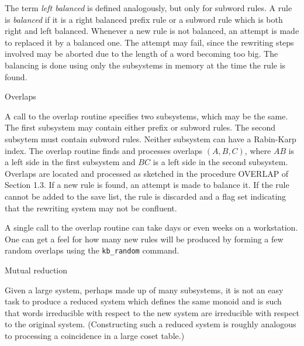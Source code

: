 The term {\it left balanced} is defined analogously, but only for
subword rules. A rule is {\it balanced} if it is a right balanced
prefix rule or a subword rule which is both right and left balanced.
Whenever a new rule is not balanced, an attempt is made to replaced it
by a balanced one.  The attempt may fail, since the rewriting steps
involved may be aborted due to the length of a word becoming too big.
The balancing is done using only the subsystems in memory at the time
the rule is found.

\bigskip
{} Overlaps

\nobreak

A call to the overlap routine specifies two subsystems, which may be
the same. The first subsystem may contain either prefix or subword
rules. The second subsytem must contain subword rules. Neither
subsystem can have a Rabin-Karp index.  The overlap routine finds and
processes overlaps $(A,B,C)$, where $AB$ is a left side in the first
subsystem and $BC$ is a left side in the second subsystem.  Overlaps
are located and processed as sketched in the procedure OVERLAP of
Section 1.3.  If a new rule is found, an attempt is made to balance
it.  If the rule cannot be added to the save list, the rule is
discarded and a flag set indicating that the rewriting system may not
be confluent.

A single call to the overlap routine can take days or even weeks on a
workstation.  One can get a feel for how many new rules will be
produced by forming a few random overlaps using the {\tt kb\_random}
command.

\bigskip
{} Mutual reduction

\nobreak

Given a large system, perhaps made up of many subsystems, it is not an
easy task to produce a reduced system which defines the same monoid
and is such that words irreducible with respect to the new system are
irreducible with respect to the original system. (Constructing such a
reduced system is roughly analogous to processing a coincidence in a
large coset table.)


